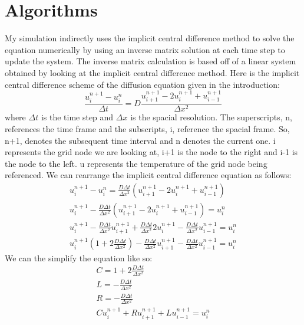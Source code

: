 \documentclass[12pt]{article}
\begin{document}
\section{Algorithms}
My simulation indirectly uses the implicit central difference method to solve the equation numerically by using an inverse matrix solution at each time step to update the system. The inverse matrix calculation is based off of a linear system obtained by looking at the implicit central difference method. Here is the implicit central difference scheme of the diffusion equation given in the introduction:
\begin{equation}
\frac{u_i^{n+1}-u_i^n}{\Delta t} = D\frac{u_{i+1}^{n+1}-2u_i^{n+1}+u_{i-1}^{n+1}}{\Delta x^2}
\end{equation}
where $ \Delta t $ is the time step and $ \Delta x $ is the spacial resolution. The superscripts, n, references the time frame and the subscripts, i, reference the spacial frame. So, n+1, denotes the subsequent time interval and n denotes the current one. i represents the grid node we are looking at, i+1 is the node to the right and i-1 is the node to the left. u represents the temperature of the grid node being referenced. We can rearrange the implicit central difference equation as follows:
\begin{equation}
\begin{aligned}
u_i^{n+1}-u_i^n = \frac{D\Delta t}{\Delta x^2}(u_{i+1}^{n+1}-2u_i^{n+1}+u_{i-1}^{n+1}) \\
u_i^{n+1}-\frac{D\Delta t}{\Delta x^2}(u_{i+1}^{n+1}-2u_i^{n+1}+u_{i-1}^{n+1}) = u_i^n \\
u_i^{n+1}-\frac{D\Delta t}{\Delta x^2}u_{i+1}^{n+1}+\frac{D\Delta t}{\Delta x^2}2u_i^{n+1}-\frac{D\Delta t}{\Delta x^2}u_{i-1}^{n+1} = u_i^n \\
u_i^{n+1}(1 + 2\frac{D\Delta t}{\Delta x^2})-\frac{D\Delta t}{\Delta x^2}u_{i+1}^{n+1}-\frac{D\Delta t}{\Delta x^2}u_{i-1}^{n+1} = u_i^n
\end{aligned}
\end{equation}
We can the simplify the equation like so:
\begin{equation}
\begin{aligned}
C = 1 + 2\frac{D\Delta t}{\Delta x^2} \\
L = -\frac{D\Delta t}{\Delta x^2} \\
R = -\frac{D\Delta t}{\Delta x^2} \\
Cu_i^{n+1} + Ru_{i+1}^{n+1} + Lu_{i-1}^{n+1} = u_i^n
\end{aligned}
\end{equation}
\end{document}
